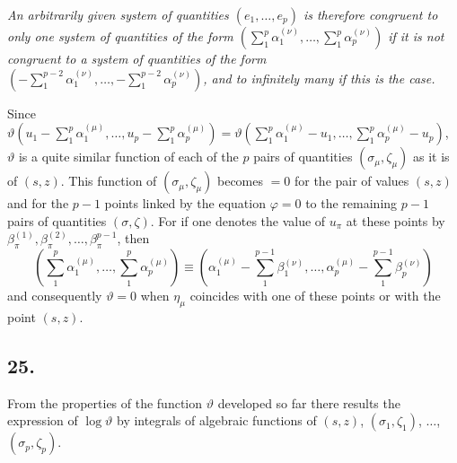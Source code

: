 \documentclass{article}
\begin{document}
\emph{An arbitrarily given system of quantities $(e_{1}, \ldots, e_{p})$ is therefore congruent to only one system of quantities of the form $\left(\displaystyle\sum_{1}^{p} \alpha_{1}^{(\nu)}, \ldots, \sum_{1}^{p} \alpha_{p}^{(\nu)}\right)$ if it is not congruent to a system of quantities of the form $\left(-\displaystyle\sum_{1}^{p-2} \alpha_{1}^{(\nu)}, \ldots, -\sum_{1}^{p-2} \alpha_{p}^{(\nu)}\right)$, and to infinitely many if this is the case.}

Since $\vartheta\left(u_{1} - \displaystyle\sum_{1}^{p} \alpha_{1}^{(\mu)}, \ldots, u_{p} - \sum_{1}^{p} \alpha_{p}^{(\mu)}\right) = \vartheta\left(\displaystyle\sum_{1}^{p} \alpha_{1}^{(\mu)} - u_{1}, \ldots, \sum_{1}^{p} \alpha_{p}^{(\mu)} - u_{p}\right)$, $\vartheta$ is a quite similar function of each of the $p$ pairs of quantities $(\sigma_{\mu}, \zeta_{\mu})$ as it is of $(s, z)$. This function of $(\sigma_{\mu}, \zeta_{\mu})$ becomes $= 0$ for the pair of values $(s, z)$ and for the $p-1$ points linked by the equation $\varphi = 0$ to the remaining $p-1$ pairs of quantities $(\sigma, \zeta)$. For if one denotes the value of $u_{\pi}$ at these points by $\beta_{\pi}^{(1)}, \beta_{\pi}^{(2)}, \ldots, \beta_{\pi}^{p-1}$, then
\[ \left(\sum_{1}^{p} \alpha_{1}^{(\mu)}, \ldots, \sum_{1}^{p} \alpha_{p}^{(\mu)}\right) \equiv \left(\alpha_{1}^{(\mu)} - \sum_{1}^{p-1} \beta_{1}^{(\nu)}, \ldots, \alpha_{p}^{(\mu)} - \sum_{1}^{p-1} \beta_{p}^{(\nu)}\right) \]
and consequently $\vartheta = 0$ when $\eta_{\mu}$ coincides with one of these points or with the point $(s, z)$.

\subsection*{25.}

From the properties of the function $\vartheta$ developed so far there results the expression of $\log\vartheta$ by integrals of algebraic functions of $(s, z)$, $(\sigma_{1}, \zeta_{1})$, $\ldots$, $(\sigma_{p}, \zeta_{p})$.
\end{document}
